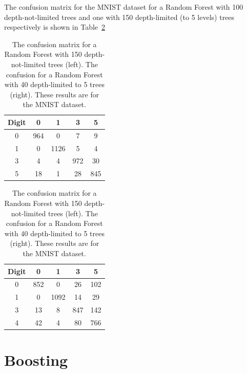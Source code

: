 \documentclass[5pt]{article}
\begin{document}
The confusion matrix for the MNIST dataset for a Random Forest with 100 depth-not-limited 
trees and one with 150 depth-limited (to 5 levels) trees respectively is shown
in Table~\ref{tab:confusionMNIST}
\begin{table}
\centering
\begin{tabular}{ccccc}
\toprule
Digit & 0 & 1 & 3 & 5 \\
\midrule
0 & 964 & 0 & 7 & 9\\
1 & 0 & 1126 & 5 & 4\\
3 & 4 & 4 & 972 & 30\\
5 & 18 & 1 & 28 & 845\\
\bottomrule
\end{tabular}
\quad
\begin{tabular}{ccccc}
\toprule
Digit & 0 & 1 & 3 & 5\\
\midrule
0 & 852 & 0 & 26 & 102\\
1 & 0  & 1092 &  14 & 29\\
3 & 13 & 8 & 847 & 142\\
4 & 42 & 4 & 80 & 766\\
\bottomrule
\end{tabular}
\caption{The confusion matrix for a Random Forest with 150 depth-not-limited
  trees (left). The confusion for a Random Forest with 40 depth-limited to 5
trees (right). These results are for the MNIST dataset.}
\label{tab:confusionMNIST}
\end{table}


\section{Boosting}
\end{document}
